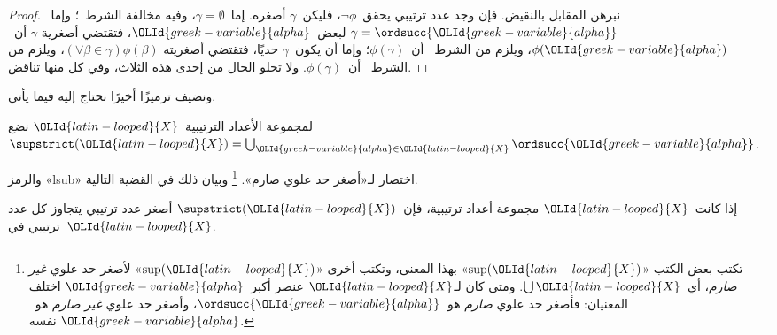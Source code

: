\documentclass[../../../include/open-logic-section]{subfiles}
\begin{document}
\begin{proof}
نبرهن المقابل بالنقيض. فإن وجد عدد ترتيبي يحقق~$\lnot\phi$،
فليكن~$\gamma$ أصغره. إما~$\gamma = \emptyset$، وفيه مخالفة الشرط~؛
وإما~$\gamma = \ordsucc{\OLId{greek-variable}{alpha}}$ لبعض~$\OLId{greek-variable}{alpha}$، فتقتضي أصغرية
$\gamma$ أن~$\phi(\OLId{greek-variable}{alpha})$، ويلزم من الشرط~ أن~$\phi(\gamma)$؛
وإما أن يكون~$\gamma$ حديًا، فتقتضي أصغريته
$(\forall \beta \in \gamma)\phi(\beta)$، ويلزم من الشرط~ أن~$\phi(\gamma)$.
ولا تخلو الحال من إحدى هذه الثلاث، وفي كل منها تناقض.
\end{proof}
\noindent
ونضيف ترميزًا أخيرًا نحتاج إليه فيما يأتي.

\begin{defn}
لمجموعة الأعداد الترتيبية~$\OLId{latin-looped}{X}$ نضع
$\supstrict(\OLId{latin-looped}{X}) = \bigcup_{\OLId{greek-variable}{alpha} \in \OLId{latin-looped}{X}} \ordsucc{\OLId{greek-variable}{alpha}}$.
\end{defn}
\noindent
والرمز «lsub» اختصار لـ«أصغر حد علوي صارم».
\footnote{تكتب بعض الكتب «$\text{sup}(\OLId{latin-looped}{X})$» بهذا المعنى، وتكتب أخرى
«$\text{sup}(\OLId{latin-looped}{X})$» لأصغر حد علوي \emph{غير صارم}، أي~$\bigcup \OLId{latin-looped}{X}$.
ومتى كان لـ$\OLId{latin-looped}{X}$ عنصر أكبر~$\OLId{greek-variable}{alpha}$ اختلف المعنيان: فأصغر حد علوي
\emph{صارم} هو~$\ordsucc{\OLId{greek-variable}{alpha}}$، وأصغر حد علوي
\emph{غير صارم} هو~$\OLId{greek-variable}{alpha}$ نفسه.}
وبيان ذلك في القضية التالية.

\begin{prop}
إذا كانت~$\OLId{latin-looped}{X}$ مجموعة أعداد ترتيبية، فإن~$\supstrict(\OLId{latin-looped}{X})$ أصغر عدد
ترتيبي يتجاوز كل عدد ترتيبي في~$\OLId{latin-looped}{X}$.
\end{prop}
\end{document}
